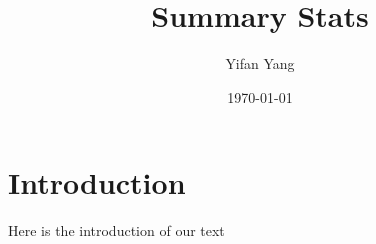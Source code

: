 \documentclass[12pt]{article}
\title{Summary Stats}
\author{Yifan Yang}
\date{\today}
\begin{document}
\maketitle

\section{Introduction}

Here is the introduction of our text


\end{document}
